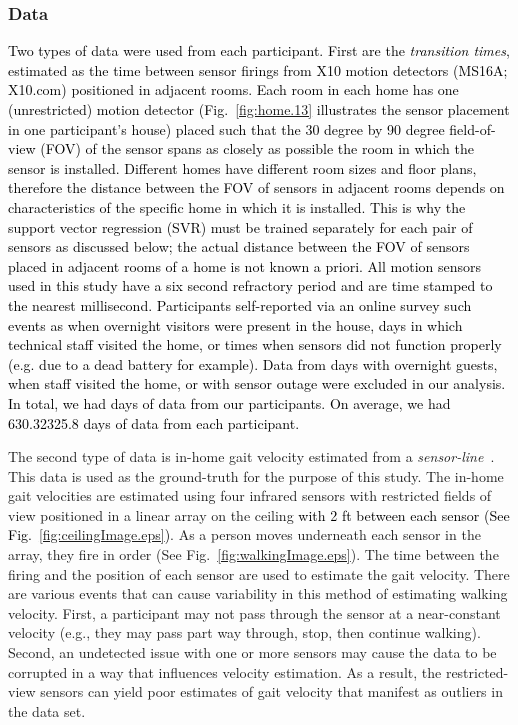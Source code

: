 \documentclass[journal]{IEEEtran}
\newcommand{\RR}[1]{\textcolor{black}{#1}}
\newcommand{\ca}[1]{\textcolor{black}{#1}}
\newcommand{\DA}[1]{\textcolor{black}{#1}}
\begin{document}
\subsubsection{Data}
\DA{\RR{Two} types of data were used from each participant.  First are the \emph{transition times}, estimated as the time between sensor firings from X10 motion detectors (MS16A; X10.com) positioned in adjacent rooms. Each room in each home has one (unrestricted) motion detector (Fig.~\ref{fig:home.13} illustrates the sensor placement in one participant's house) placed such that the 30 degree by 90 degree field-of-view (FOV) of the sensor spans as closely as possible the room in which the sensor is installed.  Different homes have different room sizes and floor plans, therefore the distance between the FOV of sensors in adjacent rooms depends on characteristics of the specific home in which it is installed.  This is why the support vector regression (SVR) must be trained separately for each pair of sensors as discussed below; the actual distance between the FOV of sensors placed in adjacent rooms of a home is not known a priori. All motion sensors used in this study have a six second refractory period and are time stamped to the nearest millisecond.  
Participants self-reported via an online survey such events as when overnight visitors were present in the house, days in which technical staff visited the home, or times when sensors did not function properly (e.g. due to a dead battery for  example). Data from days with overnight guests, when staff visited the home, or with sensor outage were excluded in our analysis. \RR{In total, we had  days of data from our  participants. \ca{On average, we had 630.32325.8 days of data from each participant.}}} 


The second type of data is in-home gait velocity estimated from a \emph{sensor-line}~\cite{hagler2010unobtrusive}.  This data is used as the ground-truth for the purpose of this study. The in-home gait velocities are estimated using four infrared sensors with restricted fields of view positioned in a linear array on the ceiling \DA{with 2 ft between each sensor (See Fig.~\ref{fig:ceilingImage.eps})}.  As a person moves underneath each sensor in the array, they fire in order (See Fig.~\ref{fig:walkingImage.eps}).  The time between the firing and the position of each sensor are used to estimate the gait velocity. There are various events that can cause variability in this method of estimating walking velocity.  First, a participant may not pass through the sensor at a near-constant velocity (e.g., they may pass part way through, stop, then continue walking). Second, an undetected issue with one or more sensors may cause the data to be corrupted in a way that influences velocity estimation.  As a result, the restricted-view sensors can yield poor estimates of gait velocity that manifest as outliers in the data set.  
\end{document}
